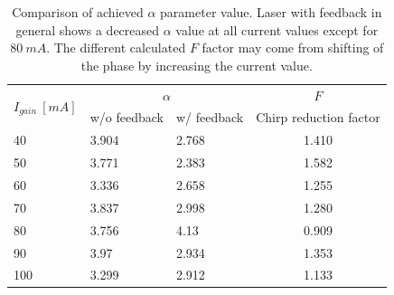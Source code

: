 \begin{table}[ht]
    \centering
    \caption{Comparison of achieved $\alpha$ parameter value. Laser with feedback in general shows a decreased $\alpha$ value at all current values except for $80 \ mA$. The different calculated $F$ factor may come from shifting of the phase by increasing the current value.}
    \label{tab:chirp_alpha_comparison}
    \begin{tabular}{@{}llll@{}}
    \toprule
    \multirow{2}{*}{$I_{gain} \ [mA]$} & \multicolumn{2}{c}{$\alpha$} & \multicolumn{1}{c}{$F$} \\
                                      & w/o feedback   & w/ feedback & Chirp reduction factor  \\ \midrule
    40                                & 3.904          & 2.768       & \multicolumn{1}{c}{1.410}                   \\
    50                                & 3.771          & 2.383       & \multicolumn{1}{c}{1.582}                   \\
    60                                & 3.336          & 2.658       & \multicolumn{1}{c}{1.255}                   \\
    70                                & 3.837          & 2.998       & \multicolumn{1}{c}{1.280}                   \\
    80                                & 3.756          & 4.13        & \multicolumn{1}{c}{0.909}                   \\
    90                                & 3.97           & 2.934       & \multicolumn{1}{c}{1.353}                   \\
    100                               & 3.299          & 2.912       & \multicolumn{1}{c}{1.133}                   \\ \bottomrule
    \end{tabular}
\end{table}

